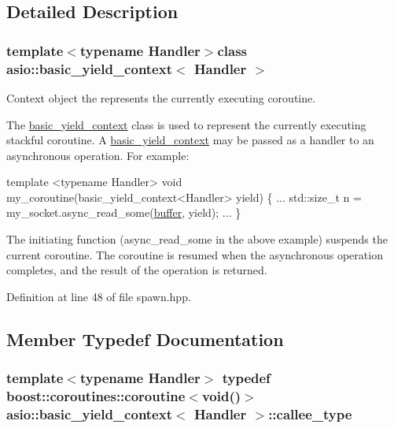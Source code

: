 \subsection{Detailed Description}
\subsubsection*{template$<$typename Handler$>$class asio\+::basic\+\_\+yield\+\_\+context$<$ Handler $>$}

Context object the represents the currently executing coroutine. 

The \hyperlink{classasio_1_1basic__yield__context}{basic\+\_\+yield\+\_\+context} class is used to represent the currently executing stackful coroutine. A \hyperlink{classasio_1_1basic__yield__context}{basic\+\_\+yield\+\_\+context} may be passed as a handler to an asynchronous operation. For example\+:


\begin{DoxyCode}
 \textcolor{keyword}{template} <\textcolor{keyword}{typename} Handler>
\textcolor{keywordtype}{void} my\_coroutine(basic\_yield\_context<Handler> yield)
\{
  ...
  std::size\_t n = my\_socket.async\_read\_some(\hyperlink{group__buffer_ga1ed66e401559cbfd19595392f653b47c}{buffer}, yield);
  ...
\} 
\end{DoxyCode}


The initiating function (async\+\_\+read\+\_\+some in the above example) suspends the current coroutine. The coroutine is resumed when the asynchronous operation completes, and the result of the operation is returned. 

Definition at line 48 of file spawn.\+hpp.



\subsection{Member Typedef Documentation}
\hypertarget{classasio_1_1basic__yield__context_afd9613f4a7188a89d349a3aa34b88220}{}
\subsubsection[{callee\+\_\+type}]{\setlength{\rightskip}{0pt plus 5cm}template$<$typename Handler$>$ typedef boost\+::coroutines\+::coroutine$<$void()$>$ {\bf asio\+::basic\+\_\+yield\+\_\+context}$<$ Handler $>$\+::{\bf callee\+\_\+type}}\label{classasio_1_1basic__yield__context_afd9613f4a7188a89d349a3aa34b88220}


